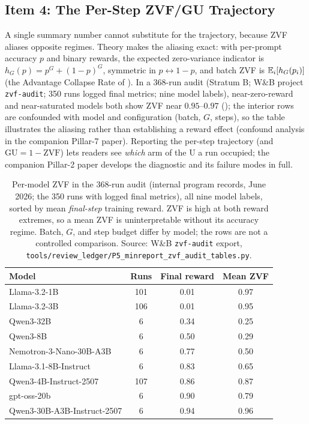 \subsection{Item 4: The Per-Step ZVF/GU Trajectory}
\label{sec:p5-item4}
A single summary number cannot substitute for the trajectory, because ZVF
aliases opposite regimes. Theory makes the aliasing exact: with per-prompt
accuracy $p$ and binary rewards, the expected zero-variance indicator is
$h_G(p)=p^G + (1-p)^G$, symmetric in $p \leftrightarrow 1-p$, and batch ZVF is
$\mathbb{E}_i[h_G(p_i)]$ (the Advantage Collapse Rate of \citet{he2026advantage}). In a
368-run audit (Stratum B; W\&B project \texttt{zvf-audit}; 350 runs logged
final metrics; nine model labels), near-zero-reward and
near-saturated models both show ZVF near $0.95$--$0.97$
(); the interior rows are confounded with model and
configuration (batch, $G$, steps), so the table illustrates the aliasing
rather than establishing a reward effect (confound analysis in the companion
Pillar-7 paper). Reporting
the per-step trajectory (and $\mathrm{GU} = 1 - \mathrm{ZVF}$) lets readers
see \emph{which} arm of the U a run occupied; the companion Pillar-2 paper
develops the diagnostic and its failure modes in full.

\begin{table}[t]
\centering
\caption{Per-model ZVF in the 368-run audit (internal program records, June
2026; the 350 runs with logged final metrics), all nine model labels, sorted by mean \emph{final-step} training
reward. ZVF is high at both reward extremes, so a mean ZVF is uninterpretable
without its accuracy regime. Batch, $G$, and step budget differ by model; the
rows are not a controlled comparison. Source: W\&B \texttt{zvf-audit} export,
\texttt{tools/review\_ledger/P5\_minreport\_zvf\_audit\_tables.py}.}
\label{tab:p5-ushape}
\small
\begin{tabular}{@{}lccc@{}}
\toprule
Model & Runs & Final reward & Mean ZVF \\
\midrule
Llama-3.2-1B        & 101 & 0.01 & 0.97 \\
Llama-3.2-3B        & 106 & 0.01 & 0.95 \\
Qwen3-32B           & 6 & 0.34 & 0.25 \\
Qwen3-8B            & 6 & 0.50 & 0.29 \\
Nemotron-3-Nano-30B-A3B & 6 & 0.77 & 0.50 \\
Llama-3.1-8B-Instruct & 6 & 0.83 & 0.65 \\
Qwen3-4B-Instruct-2507 & 107 & 0.86 & 0.87 \\
gpt-oss-20b         & 6 & 0.90 & 0.79 \\
Qwen3-30B-A3B-Instruct-2507 & 6 & 0.94 & 0.96 \\
\bottomrule
\end{tabular}
\end{table}

